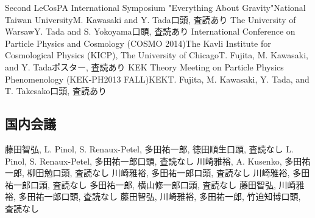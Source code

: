 \documentclass[11pt,letterpaper,sans]{moderncv}
\begin{document}
{Second LeCosPA International Symposium "Everything About Gravity"}{National Taiwan University}{M. Kawasaki and Y. Tada}{口頭, 査読あり}
{The University of Warsaw}{Y. Tada and S. Yokoyama}{口頭, 査読あり}
{International Conference on Particle Physics and Cosmology (COSMO 2014)}{The Kavli Institute for Cosmological Physics (KICP), The University of Chicago}{T. Fujita, M. Kawasaki, and Y. Tada}{ポスター, 査読あり}
{KEK Theory Meeting on Particle Physics Phenomenology (KEK-PH2013 FALL)}{KEK}{T. Fujita, M. Kawasaki, Y. Tada, and T. Takesako}{口頭, 査読あり}

\medskip
\subsection{国内会議}
{藤田智弘, L. Pinol, S. Renaux-Petel, 多田祐一郎, 徳田順生}{口頭, 査読なし}
{L. Pinol, S. Renaux-Petel, 多田祐一郎}{口頭, 査読なし}
{川崎雅裕, A. Kusenko, 多田祐一郎, 柳田勉}{口頭, 査読なし}
{川崎雅裕, 多田祐一郎}{口頭, 査読なし}
{川崎雅裕, 多田祐一郎}{口頭, 査読なし}
{多田祐一郎, 横山修一郎}{口頭, 査読なし}
{藤田智弘, 川崎雅裕, 多田祐一郎}{口頭, 査読なし}
{藤田智弘, 川崎雅裕, 多田祐一郎, 竹迫知博}{口頭, 査読なし}


\medskip
\end{document}

